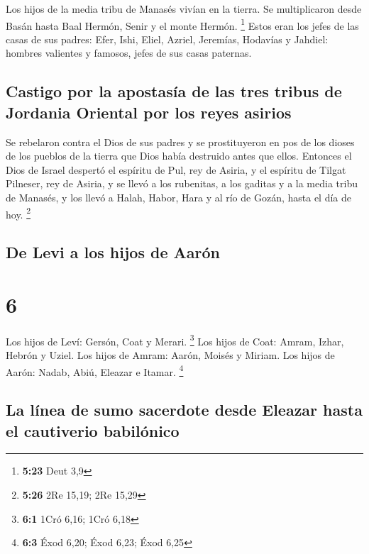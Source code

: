  Los hijos de la media tribu de Manasés vivían en la
tierra. Se multiplicaron desde Basán hasta Baal Hermón, Senir y el monte
Hermón. \footnote{\textbf{5:23} Deut 3,9}  Estos eran los
jefes de las casas de sus padres: Efer, Ishi, Eliel, Azriel, Jeremías,
Hodavías y Jahdiel: hombres valientes y famosos, jefes de sus casas
paternas.

\hypertarget{castigo-por-la-apostasuxeda-de-las-tres-tribus-de-jordania-oriental-por-los-reyes-asirios}{%
\subsection{Castigo por la apostasía de las tres tribus de Jordania
Oriental por los reyes
asirios}\label{castigo-por-la-apostasuxeda-de-las-tres-tribus-de-jordania-oriental-por-los-reyes-asirios}}

 Se rebelaron contra el Dios de sus padres y se
prostituyeron en pos de los dioses de los pueblos de la tierra que Dios
había destruido antes que ellos.  Entonces el Dios de
Israel despertó el espíritu de Pul, rey de Asiria, y el espíritu de
Tilgat Pilneser, rey de Asiria, y se llevó a los rubenitas, a los
gaditas y a la media tribu de Manasés, y los llevó a Halah, Habor, Hara
y al río de Gozán, hasta el día de hoy. \footnote{\textbf{5:26} 2Re
  15,19; 2Re 15,29}

\hypertarget{de-levi-a-los-hijos-de-aaruxf3n}{%
\subsection{De Levi a los hijos de
Aarón}\label{de-levi-a-los-hijos-de-aaruxf3n}}

\hypertarget{section-5}{%
\section{6}\label{section-5}}

 Los hijos de Leví: Gersón, Coat y Merari. \footnote{\textbf{6:1}
  1Cró 6,16; 1Cró 6,18}  Los hijos de Coat: Amram, Izhar,
Hebrón y Uziel.  Los hijos de Amram: Aarón, Moisés y
Miriam. Los hijos de Aarón: Nadab, Abiú, Eleazar e Itamar. \footnote{\textbf{6:3}
  Éxod 6,20; Éxod 6,23; Éxod 6,25}

\hypertarget{la-luxednea-de-sumo-sacerdote-desde-eleazar-hasta-el-cautiverio-babiluxf3nico}{%
\subsection{La línea de sumo sacerdote desde Eleazar hasta el cautiverio
babilónico}\label{la-luxednea-de-sumo-sacerdote-desde-eleazar-hasta-el-cautiverio-babiluxf3nico}}

